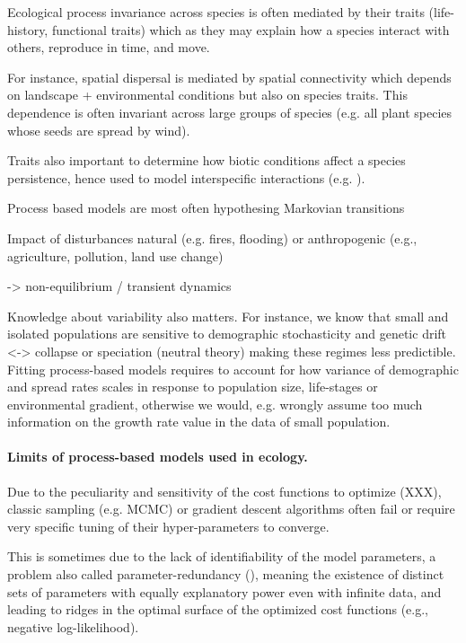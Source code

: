 Ecological process invariance across species is often mediated by their traits (life-history, functional traits) which as they may explain how a species interact with others, reproduce in time, and move.

For instance, spatial dispersal is mediated by spatial connectivity which depends on landscape + environmental conditions but also on species traits. This dependence is often invariant across large groups of species (e.g. all plant species whose seeds are spread by wind).

Traits also important to determine how biotic conditions affect a species persistence, hence used to model interspecific interactions (e.g. \cite{chalmandrier2022predictions}).

Process based models are most often hypothesing Markovian transitions

Impact of disturbances natural (e.g. fires, flooding) or anthropogenic (e.g., agriculture, pollution, land use change) 

-> non-equilibrium / transient dynamics

Knowledge about variability also matters. For instance, we know that small and isolated populations are sensitive to demographic stochasticity and genetic drift <-> collapse or speciation (neutral theory) making these regimes less predictible. Fitting process-based models requires to account for how variance of demographic and spread rates scales in response to population size, life-stages or environmental gradient, otherwise we would, e.g. wrongly assume too much information on the growth rate value in the data of small population. 

\paragraph{Limits of process-based models used in ecology.} 

Due to the peculiarity and sensitivity of the cost functions to optimize (XXX), classic sampling (e.g. MCMC) or gradient descent algorithms often fail or require very specific tuning of their hyper-parameters to converge.

This is sometimes due to the lack of identifiability of the model parameters, a problem also called parameter-redundancy (\cite{cole2020parameter}), meaning the existence of distinct sets of parameters with equally explanatory power even with infinite data, and leading to ridges in the optimal surface of the optimized cost functions (e.g., negative log-likelihood). 

